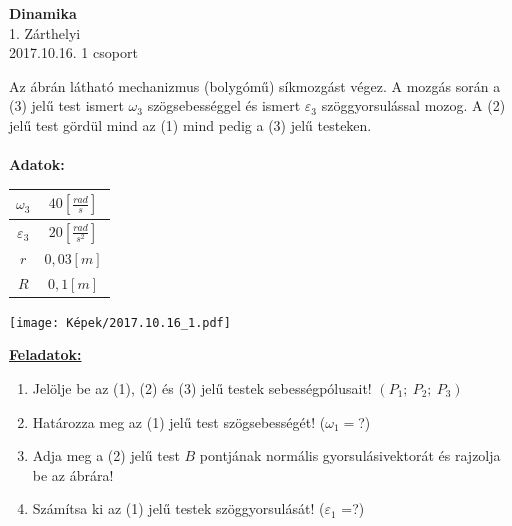 \documentclass[11pt,a4paper]{article}
\begin{document}
\begin{center}
    \textbf{\LARGE{Dinamika}}\\
    1. Zárthelyi\\
    2017.10.16. 1 csoport
\end{center}
Az ábrán látható mechanizmus (bolygómű) síkmozgást végez. A mozgás során a (3) jelű test ismert $\omega_3$ szögsebességgel és ismert $\varepsilon_3$ szöggyorsulással mozog. A (2) jelű test gördül mind az (1) mind pedig a (3) jelű testeken.\\\\
\textbf{Adatok:}\\
\begin{tabular}{| c | c |}
    \hline
    $\omega_3 $&$ 40 \left[\frac{rad}{s}\right]$\\
    \hline
    $\varepsilon_3 $&$ 20 \left[\frac{rad}{s^2}\right]$\\
    \hline
    $r $&$ 0,03 [m]$\\
    \hline
    $R $&$ 0,1 [m]$\\
    \hline
\end{tabular}
\begin{center}
    \texttt{[image: Képek/2017.10.16\_1.pdf]}
\end{center}

\underline{\textbf{Feladatok:}}
\begin{enumerate}
    \item Jelölje be az (1), (2) és (3) jelű testek sebességpólusait! $(P_1;\ P_2;\ P_3)$
    \item Határozza meg az (1) jelű test szögsebességét! ($\omega_1 = $?)
    \item Adja meg a (2) jelű test $B$ pontjának normális gyorsulásivektorát és rajzolja be az ábrára!
    \item Számítsa ki az (1) jelű testek szöggyorsulását! ($\varepsilon_1$ =?)
\end{enumerate}
\newpage
\end{document}
